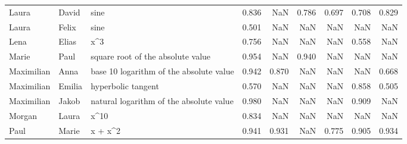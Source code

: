\begin{tabular}{lllrrrrrr}
     Laura &      David &                                    sine &                                             0.836 &        NaN &     0.786 &    0.697 &                            0.708 &     0.829 \\
     Laura &      Felix &                                    sine &                                             0.501 &        NaN &       NaN &      NaN &                              NaN &       NaN \\
      Lena &      Elias &                                     x\textasciicircum 3 &                                             0.756 &        NaN &       NaN &      NaN &                            0.558 &       NaN \\
     Marie &       Paul &       square root of the absolute value &                                             0.954 &        NaN &     0.940 &      NaN &                              NaN &       NaN \\
Maximilian &       Anna & base 10 logarithm of the absolute value &                                             0.942 &      0.870 &       NaN &      NaN &                              NaN &     0.668 \\
Maximilian &     Emilia &                      hyperbolic tangent &                                             0.570 &        NaN &       NaN &      NaN &                            0.858 &     0.505 \\
Maximilian &      Jakob & natural logarithm of the absolute value &                                             0.980 &        NaN &       NaN &      NaN &                            0.909 &       NaN \\
    Morgan &      Laura &                                    x\textasciicircum 10 &                                             0.834 &        NaN &       NaN &      NaN &                              NaN &       NaN \\
      Paul &      Marie &                                 x + x\textasciicircum 2 &                                             0.941 &      0.931 &       NaN &    0.775 &                            0.905 &     0.934 \\
\bottomrule
\end{tabular}

